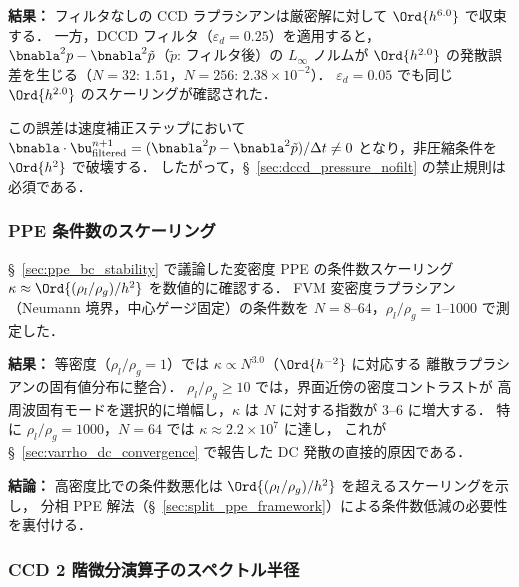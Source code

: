 \noindent\textbf{結果：}
フィルタなしの CCD ラプラシアンは厳密解に対して $\Ord{h^{6.0}}$ で収束する．
一方，DCCD フィルタ（$\varepsilon_d = 0.25$）を適用すると，
$\bnabla^2 p - \bnabla^2 \tilde{p}$（$\tilde{p}$: フィルタ後）の $L_\infty$ ノルムが
$\Ord{h^{2.0}}$ の発散誤差を生じる（$N = 32$: $1.51$，$N = 256$: $2.38 \times 10^{-2}$）．
$\varepsilon_d = 0.05$ でも同じ $\Ord{h^{2.0}}$ のスケーリングが確認された．

この誤差は速度補正ステップにおいて
$\bnabla \cdot \bu^{n+1}_{\mathrm{filtered}} =
(\bnabla^2 p - \bnabla^2 \tilde{p})/\Delta t \neq 0$
となり，非圧縮条件を $\Ord{h^2}$ で破壊する．
したがって，§~\ref{sec:dccd_pressure_nofilt} の禁止規則は必須である．

\subsubsection{PPE 条件数のスケーリング}
\label{sec:verify_ppe_condition}

§~\ref{sec:ppe_bc_stability} で議論した変密度 PPE の条件数スケーリング
$\kappa \approx \Ord{(\rho_l/\rho_g) / h^2}$ を数値的に確認する．
FVM 変密度ラプラシアン（Neumann 境界，中心ゲージ固定）の条件数を
$N = 8$--$64$，$\rho_l/\rho_g = 1$--$1000$ で測定した．

\noindent\textbf{結果：}
等密度（$\rho_l/\rho_g = 1$）では $\kappa \propto N^{3.0}$（$\Ord{h^{-2}}$ に対応する
離散ラプラシアンの固有値分布に整合）．
$\rho_l/\rho_g \geq 10$ では，界面近傍の密度コントラストが
高周波固有モードを選択的に増幅し，$\kappa$ は $N$ に対する指数が
3--6 に増大する．
特に $\rho_l/\rho_g = 1000$，$N = 64$ では $\kappa \approx 2.2 \times 10^7$ に達し，
これが §~\ref{sec:varrho_dc_convergence} で報告した DC 発散の直接的原因である．

\noindent\textbf{結論：}
高密度比での条件数悪化は $\Ord{(\rho_l/\rho_g)/h^2}$ を超えるスケーリングを示し，
分相 PPE 解法（§~\ref{sec:split_ppe_framework}）による条件数低減の必要性を裏付ける．


\subsubsection{CCD 2 階微分演算子のスペクトル半径}
\label{sec:verify_ccd_spectral_radius}

